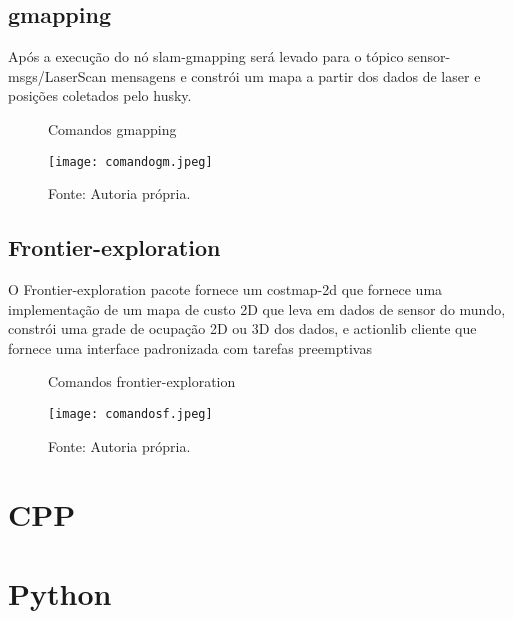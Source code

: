 \subsection{gmapping}
Após a execução do nó slam-gmapping será levado para o tópico sensor-msgs/LaserScan mensagens e constrói um mapa a partir dos dados de laser e posições coletados pelo husky.
\begin{figure} [h!]	
    \centering
    \caption{Comandos gmapping}
    \texttt{[image: comandogm.jpeg]}
    \caption*{Fonte: Autoria própria.}
    \label{fig:gmapping}
\end{figure}
\subsection{Frontier-exploration}
O Frontier-exploration pacote fornece um costmap-2d que fornece uma implementação de um mapa de custo 2D que leva em dados de sensor do mundo, constrói uma grade de ocupação 2D ou 3D dos dados, e actionlib cliente que fornece uma interface padronizada com tarefas preemptivas
\begin{figure} [h!]	
    \centering
    \caption{Comandos frontier-exploration }
    \texttt{[image: comandosf.jpeg]}
    \caption*{Fonte: Autoria própria.}
    \label{fig:frontier-exploration}
\end{figure}
\section{CPP}
\section{Python}


